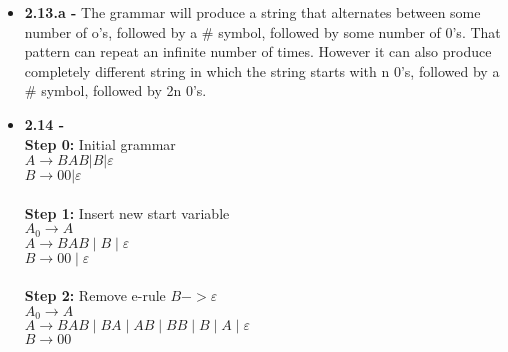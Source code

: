 \documentclass{article}
\begin{document}
\begin{itemize}
  \item \textbf{2.13.a -} The grammar will produce a string that alternates between some number of o's, followed by a $\#$ symbol, followed by some number of 0's. That pattern can repeat an infinite number of times. However it can also produce completely different string in which the string starts with n 0's, followed by a $\#$ symbol, followed by 2n 0's.
  \item \textbf{2.14 -} \\
    \textbf{Step 0:} Initial grammar \\
    $A \to BAB | B | \varepsilon$ \\
    $B \to 00 | \varepsilon$ \\
    \\
    \textbf{Step 1:} Insert new start variable \\
    $A_{0} \to A$ \\
    $A \to BAB \mid B \mid \varepsilon$ \\
    $B \to 00 \mid \varepsilon$ \\
    \\
    \textbf{Step 2:} Remove e-rule $B -> \varepsilon$ \\
    $A_{0} \to A$ \\
    $A \to BAB \mid BA \mid AB \mid BB \mid B \mid A \mid \varepsilon$ \\
    $B \to 00$ \\

\end{itemize}
\end{document}
